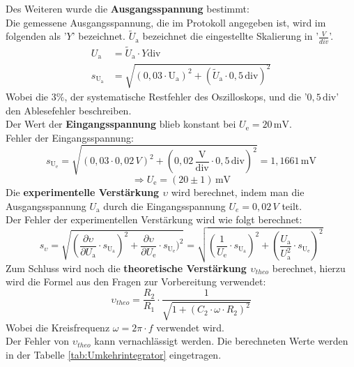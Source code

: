 Des Weiteren wurde die \textbf{Ausgangsspannung} bestimmt:\\
Die gemessene Ausgangsspannung, die im Protokoll angegeben ist, 
wird im folgenden als '$Y$' bezeichnet.
$\tilde{U}_\text{a}$ bezeichnet die eingestellte Skalierung in '$\frac{V}{div}$'.
\begin{align}
    U_\text{a} &= \tilde{U}_\text{a} \cdot Y \text{div}\\
    s_{\text{U}_\text{a}} &= \sqrt{(0,03\cdot \text{U}_\text{a})^2+(\tilde{U}_\text{a}\cdot 0,5\,\text{div})^2}
\end{align}
Wobei die $3\%$, der systematische Restfehler des Oszilloskops, und die '$0,5\,\text{div}$' den Ablesefehler beschreiben.\\
Der Wert der \textbf{Eingangsspannung} blieb konstant bei $U_\text{e} = 20\,\text{mV}$.\\
Fehler der Eingangsspannung:
\begin{equation}
    s_{\text{U}_\text{e}} = \sqrt{(0,03\cdot 0,02\,V)^2+(0,02\,\frac{\text{V}}{\text{div}} \cdot 0,5\,\text{div})^2} = 1,1661\,\text{mV}
\end{equation} 
\begin{equation}
   \Rightarrow U_\text{e} = (20 \pm 1)\,\text{mV}
\end{equation}
Die \textbf{experimentelle Verstärkung $\upsilon$} wird berechnet, indem man die Ausgangsspannung $U_\text{a}$ durch 
die Eingangsspannung $U_e = 0,02\,V$ teilt. \\
Der Fehler der experimentellen Verstärkung wird wie folgt berechnet:
\begin{equation}
    s_{\upsilon} = \sqrt{(\frac{\partial \upsilon}{\partial U_\text{a}} \cdot s_{\text{U}_\text{a}})^2 +\frac{\partial \upsilon}{\partial U_\text{e}} \cdot s_{\text{U}_\text{e}})^2 } = \sqrt{(\frac{1}{U_\text{e}}\cdot s_{\text{U}_\text{a}})^2 + (\frac{U_\text{a}}{U_\text{a}^2}\cdot s_{\text{U}_\text{e}})^2}
\end{equation}
Zum Schluss wird noch die \textbf{theoretische Verstärkung $\upsilon_{theo}$} berechnet, hierzu wird die Formel 
aus den Fragen zur Vorbereitung verwendet:
\begin{equation}
    \upsilon_{theo} = \frac{R_2}{R_1} \cdot \frac{1}{\sqrt{1 + (C_2 \cdot \omega \cdot R_2)^2}}
\end{equation}
Wobei die Kreisfrequenz $\omega = 2\pi \cdot f$ verwendet wird.\\
Der Fehler von $\upsilon_{theo}$ kann vernachlässigt werden.
\newpage
Die berechneten Werte werden in der Tabelle \ref{tab:Umkehrintegrator} eingetragen.\\
